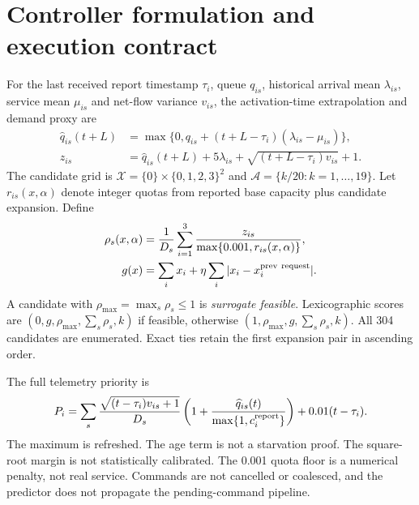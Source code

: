 \documentclass[10pt,a4paper]{article}
\newcommand{\page}[1]{\clearpage\section{#1}}
\begin{document}
\page{Controller formulation and execution contract}
For the last received report timestamp $\tau_i$, queue $q_{is}$, historical
arrival mean $\lambda_{is}$, service mean $\mu_{is}$ and net-flow variance $v_{is}$,
the activation-time extrapolation and demand proxy are
\begin{align}
\widehat q_{is}(t+L)&=\max\{0,q_{is}+(t+L-\tau_i)(\lambda_{is}-\mu_{is})\},\\
z_{is}&=\widehat q_{is}(t+L)+5\lambda_{is}+\sqrt{(t+L-\tau_i)v_{is}}+1.
\end{align}
The candidate grid is $\mathcal X=\{0\}\times\{0,1,2,3\}^2$ and
$\mathcal A=\{k/20:k=1,\ldots,19\}$. Let $r_{is}(x,\alpha)$ denote integer quotas
from reported base capacity plus candidate expansion. Define
\begin{align}
\rho_s(x,\alpha)&=\frac1{D_s}\sum_{i=1}^{3}\frac{z_{is}}{\max\{0.001,r_{is}(x,\alpha)\}},\\
g(x)&=\sum_i x_i+\eta\sum_i|x_i-x_i^{\rm prev\ request}|.
\end{align}
A candidate with $\rho_{\max}=\max_s\rho_s\le1$ is \emph{surrogate feasible}.
Lexicographic scores are $(0,g,\rho_{\max},\sum_s\rho_s,k)$ if feasible, otherwise
$(1,\rho_{\max},g,\sum_s\rho_s,k)$. All 304 candidates are enumerated. Exact ties
retain the first expansion pair in ascending order.

\begin{center}
\end{center}

The full telemetry priority is
\[
P_i=\sum_s\frac{\sqrt{(t-\tau_i)v_{is}+1}}{D_s}
\left(1+\frac{\widehat q_{is}(t)}{\max\{1,c_i^{\rm report}\}}\right)+0.01(t-\tau_i).
\]
The maximum is refreshed. The age term is not a starvation proof. The square-root
margin is not statistically calibrated. The 0.001 quota floor is a numerical
penalty, not real service. Commands are not cancelled or coalesced, and the
predictor does not propagate the pending-command pipeline.
\end{document}

